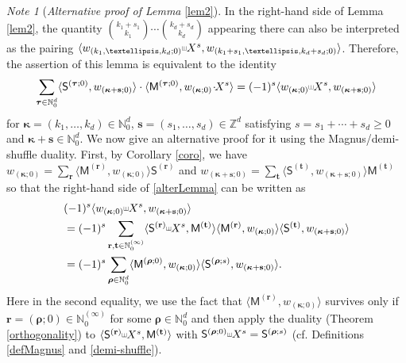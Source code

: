 \documentclass[10pt]{article}
\theoremstyle{definition}
\theoremstyle{remark}
\newtheorem{Note}[Theorem]{Note}
\def\MM{{\mathsf{M}}}
\def\SS{{\mathsf{S}}}
\def\bt{{\mathbf{t}}}
\def\bs{{\mathbf{s}}}
\def\bbr{{\mathbf{r}}}
\def\bkappa{{\boldsymbol \kappa}}
\def\btau{{\boldsymbol \tau}}
\def\brho{{\boldsymbol \rho}}
\def\lp{\langle}
\def\rp{\rangle}
\def\N{{\mathbb N}}
\def\Z{{\mathbb Z}}
\def\la{\langle}
\def\ra{\rangle}
\def\bkappa{{\boldsymbol \kappa}}
\def\brho{{\boldsymbol \rho}}
\def\sha{\scalebox{0.6}[0.8]{\rotatebox[origin=c]{-90}{$\exists$}}}
\begin{document}
\begin{Note}[{\it Alternative proof of Lemma} \ref{lem2}] \label{Quest4.3}
In the right-hand side of Lemma \ref{lem2}, the quantity
$\binom{k_1+s_1}{k_1}\cdots \binom{k_d+s_d}{k_d}$ appearing there can also be interpreted as
the pairing
$\lp w_{(k_1,\dots,k_d;0)}\sha X^s, w_{(k_1+s_1,\dots,k_d+s_d;0)} \rp$.
Therefore, the assertion of this lemma is equivalent to the identity
\begin{equation}
\sum_{\btau\in\N_0^d} 
\lp\SS^{(\btau;0)},w_{(\bkappa+\bs;0)} \rp \cdot \lp\MM^{(\btau;0)}, w_{(\bkappa;0)}\!\cdot\!\! X^s\rp
=(-1)^s 
\lp w_{(\bkappa;0)}\sha X^s, w_{(\bkappa+\bs;0)} \rp
\label{alterLemma}
\end{equation}
for $\bkappa=(k_1,\dots,k_d)\in\N_0^d$, $\bs=(s_1,\dots,s_d)\in\Z^d$ 
satisfying $s=s_1+\cdots+s_d\ge 0$ and $\bkappa+\bs\in\N_0^d$.
We now give an alternative proof for it using the Magnus/demi-shuffle duality.
First, by Corollary \ref{coro}, we have 
$w_{(\bkappa;0)}=\sum_\bbr\la \MM^{(\bbr)},w_{(\bkappa;0)}\ra \SS^{(\bbr)}$ 
and $w_{(\bkappa+\bs;0)}=\sum_\bt\la \SS^{(\bt)},w_{(\bkappa+\bs;0)}\ra \MM^{(\bt)}$
so that the right-hand side of \eqref{alterLemma} can be written as
\begin{align}
\label{RHS4.2}
&(-1)^s 
\lp w_{(\bkappa;0)}\sha X^s, w_{(\bkappa+\bs;0)} \rp \\
&=(-1)^s \sum_{\bbr,\bt\in\N_0^{(\infty)}}
\lp \SS^{(\bbr)}\sha X^s, \MM^{(\bt)} \rp
\lp \MM^{(\bbr)} ,w_{(\bkappa;0)} \rp
\lp \SS^{(\bt)} ,w_{(\bkappa+\bs;0)}\rp
\notag \\
&=(-1)^s \sum_{\brho\in\N_0^d} 
\lp \MM^{(\brho;0)} ,w_{(\bkappa;0)}\rp
\lp  \SS^{(\brho;s)}, w_{(\bkappa+\bs;0)} \rp.
\notag
\end{align}
Here in the second equality, we use the fact that
$\lp  \MM^{(\bbr)}, w_{(\bkappa;0)} \rp$ 
survives only if $\bbr=(\brho;0)\in\N_0^{(\infty)}$ for some $\brho\in\N_0^d$
and then apply the duality (Theorem \ref{orthogonality})
to $\lp \SS^{(\bbr)}\sha X^s, \MM^{(\bt)} \rp$
with $\SS^{(\brho;0)}\sha X^s=\SS^{(\brho;s)}$ 
(cf. Definitions \ref{defMagnus} and \ref{demi-shuffle}).


\end{Note}
\end{document}
